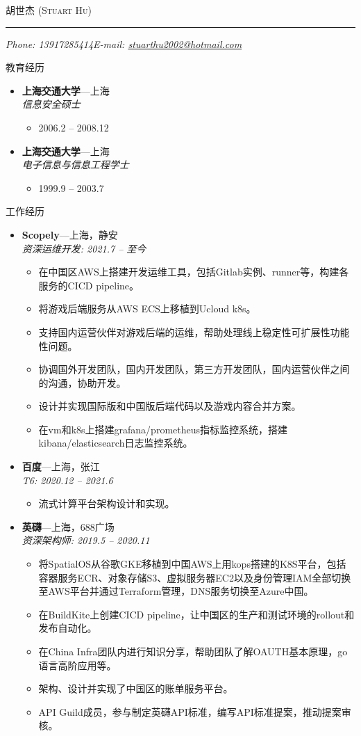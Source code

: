 \documentclass[11pt,oneside]{article}
\makeatletter
\newcommand{\name}{胡世杰 (Stuart Hu)}
\newcommand{\phone}{Phone: 13917285414}
\newcommand{\email}{E-mail: \href{mailto:stuarthu2002@hotmail.com}{stuarthu2002@hotmail.com}}
\newcommand{\bigname}[1]{
	\begin{center}\selectfont\Huge\scshape#1\end{center}
}
\newenvironment{ressection}[1]{
	\vspace{4pt}
	{\selectfont\Large#1}
	\begin{itemize}
	\vspace{3pt}
}{
	\end{itemize}
}
\newcommand{\ressubitem}[1]{
	\vspace{-1pt}
	\item \begin{flushleft} #1 \end{flushleft}
}
\newcommand{\resbigitem}[3]{
	\vspace{-5pt}
	\item
	\textbf{#1}---#2 \\
	\textit{#3}
}
\newenvironment{ressubsec}[3]{
	\resbigitem{#1}{#2}{#3}
	\vspace{-2pt}
	\begin{itemize}
}{
    \end{itemize}
}
\makeatother
\begin{document}
\begin{CJK}{UTF8}{gkai}

\bigname{\name}

\vspace{-8pt} \rule{\textwidth}{1pt}

\vspace{-1pt} {\small\itshape \phone \hfill \email}

\vspace{8 pt}


\begin{ressection}{教育经历}

	\begin{ressubsec}{上海交通大学}{上海}{信息安全硕士}
		\ressubitem{2006.2 -- 2008.12}
	\end{ressubsec}

	\begin{ressubsec}{上海交通大学}{上海}{电子信息与信息工程学士}
		\ressubitem{1999.9 -- 2003.7}
	\end{ressubsec}

\end{ressection}

\begin{ressection}{工作经历}

	\begin{ressubsec}{Scopely}{上海，静安}{资深运维开发: 2021.7 -- 至今}
		\ressubitem{在中国区AWS上搭建开发运维工具，包括Gitlab实例、runner等，构建各服务的CICD pipeline。}
		\ressubitem{将游戏后端服务从AWS ECS上移植到Ucloud k8s。}
		\ressubitem{支持国内运营伙伴对游戏后端的运维，帮助处理线上稳定性可扩展性功能性问题。}
		\ressubitem{协调国外开发团队，国内开发团队，第三方开发团队，国内运营伙伴之间的沟通，协助开发。}
		\ressubitem{设计并实现国际版和中国版后端代码以及游戏内容合并方案。}
		\ressubitem{在vm和k8s上搭建grafana/prometheus指标监控系统，搭建kibana/elasticsearch日志监控系统。}
	\end{ressubsec}

	\begin{ressubsec}{百度}{上海，张江}{T6: 2020.12 -- 2021.6}
		\ressubitem{流式计算平台架构设计和实现。}
	\end{ressubsec}

	\begin{ressubsec}{英礴}{上海，688广场}{资深架构师: 2019.5 -- 2020.11}
		\ressubitem{将SpatialOS从谷歌GKE移植到中国AWS上用kops搭建的K8S平台，包括容器服务ECR、对象存储S3、虚拟服务器EC2以及身份管理IAM全部切换至AWS平台并通过Terraform管理，DNS服务切换至Azure中国。}
		\ressubitem{在BuildKite上创建CICD pipeline，让中国区的生产和测试环境的rollout和发布自动化。}
		\ressubitem{在China Infra团队内进行知识分享，帮助团队了解OAUTH基本原理，go语言高阶应用等。}
		\ressubitem{架构、设计并实现了中国区的账单服务平台。}
		\ressubitem{API Guild成员，参与制定英礴API标准，编写API标准提案，推动提案审核。}
	\end{ressubsec}


\end{ressection}
\end{CJK}
\end{document}
